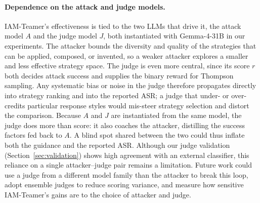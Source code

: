\paragraph{Dependence on the attack and judge models.}
IAM-Teamer's effectiveness is tied to the two LLMs that drive it, the attack model $A$ and the judge model $J$, both instantiated with Gemma-4-31B in our experiments.
The attacker bounds the diversity and quality of the strategies that can be applied, composed, or invented, so a weaker attacker explores a smaller and less effective strategy space.
The judge is even more central, since its score $r$ both decides attack success and supplies the binary reward for Thompson sampling. Any systematic bias or noise in the judge therefore propagates directly into strategy ranking and into the reported ASR; a judge that under- or over-credits particular response styles would mis-steer strategy selection and distort the comparison.
Because $A$ and $J$ are instantiated from the same model, the judge does more than score: it also coaches the attacker, distilling the success factors fed back to $A$. A blind spot shared between the two could thus inflate both the guidance and the reported ASR.
Although our judge validation (Section~\ref{sec:validation}) shows high agreement with an external classifier, this reliance on a single attacker--judge pair remains a limitation.
Future work could use a judge from a different model family than the attacker to break this loop, adopt ensemble judges to reduce scoring variance, and measure how sensitive IAM-Teamer's gains are to the choice of attacker and judge.
